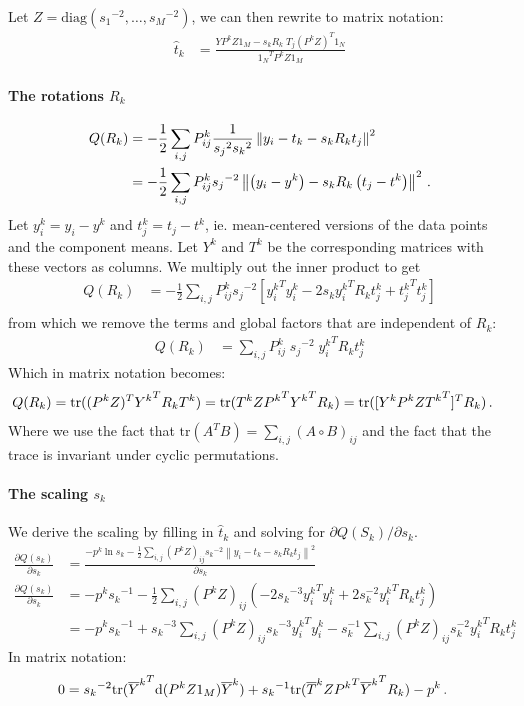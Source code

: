 \documentclass[10pt,a4paper,oneside]{article}
\theoremstyle{definition}
\newcommand{\p}{\mbox{\,.}}
\newcommand{\ol}[1]{\overline{#1}}
\theoremstyle{definition}
\begin{document}
Let $Z = \text{diag}({s_1}^{-2}, \ldots, {s_M}^{-2})$, we can then rewrite to matrix notation:
\begin{align*}
\hat t_k &= \frac{YP^kZ1_M - s_kR_k\;T_j(P^kZ)^T1_N}{{1_N}^TP^kZ1_M} 
\end{align*} 

\paragraph{The rotations $R_k$}
\begin{align*} 
Q(R_k) &= - \frac{1}{2}\sum_{i,j} P^k_{ij} \frac{1}{{s_j}^2{s_k}^2} \left\| y_i - t_k - s_kR_k t_j \right\|^2\\
&= - \frac{1}{2}\sum_{i,j} P^k_{ij} {s_j}^{-2} \left\| \left(y_i - y^k\right) - s_kR_k \left(t_j-t^k\right) \right\|^2 \p 
\end{align*}
Let ${y^k_i} = y_i - y^k$ and ${t^k_j} = t_j - t^k$, ie. mean-centered versions of the data points and the component means. Let $Y^k$ and ${T^k}$ be the corresponding matrices with these vectors as columns. We multiply out the inner product to get
\begin{align*}
Q(R_k) &= - \frac{1}{2}\sum_{i,j} P^k_{ij} {s_j}^{-2} \left[ {y_i^k}^T{y_i^k} - 2 s_k {y_i^k}^TR_k{t_j^k} + {t_j^k}^T{t_j^k} \right] \\
\end{align*}
from which we remove the terms and global factors that are independent of $R_k$:
\begin{align*}
Q(R_k)&= \sum_{i,j} P^k_{ij}\; {s_j}^{-2}\; {y_i^k}^TR_k{t_j^k}
\end{align*}
Which in matrix notation becomes:
\begin{align*} 
Q(R_k) &= \text{tr}((P^k Z)^T {Y^k}^TR_kT^k) = \text{tr}(T^k Z {P^k}^T{Y^k}^TR_k) = \text{tr}([Y^kP^kZ{T^k}^T]^TR_k) \p
\end{align*}
Where we use the fact that $\text{tr}(A^TB) = \sum_{i,j}(A\circ B)_{ij}$ and the fact that the trace is invariant under cyclic permutations.

\paragraph{The scaling $s_k$}
We derive the scaling by filling in $\hat t_k$ and solving for $\partial Q(S_k)/\partial s_k$.
\begin{align*}
\frac{\partial Q(s_k)}{\partial s_k} &=  \frac{- p^k \ln s_k - \frac{1}{2}\sum_{i,j} (P^kZ)_{ij} {s_k}^{-2} \left\|y_i - t_k - s_k R_k t_j \right\|^2}{\partial s_k}\\
\frac{\partial Q(s_k)}{\partial s_k} &= - p^k {s_k}^{-1} - \frac{1}{2}\sum_{i,j} (P^kZ)_{ij} \left(-2{s_k}^{-3} {y^k_i}^T y^k_i + 2{s_k^{-2}} {y^k_i}^TR_kt_j^k \right) \\
&= -p^k {s_k}^{-1} + {s_k}^{-3} \sum_{i, j} (P^kZ)_{ij}{s_k}^{-3} {y^k_i}^T y^k_i - s_k^{-1} \sum_{i, j}(P^kZ)_{ij}{s_k^{-2}} {y^k_i}^TR_kt_j^k
\end{align*}
In matrix notation:
\begin{align*}
0 &= {s_k}^{-2} \text{tr}({\ol{Y}^k}^T\text{d}(P^kZ1_M)\ol{Y}^k) + {s_k}^{-1} \text{tr}(\ol{T}^kZ{P^k}^T{\ol{Y}^k}^TR_k) -p^k \p
\end{align*}
\end{document}
